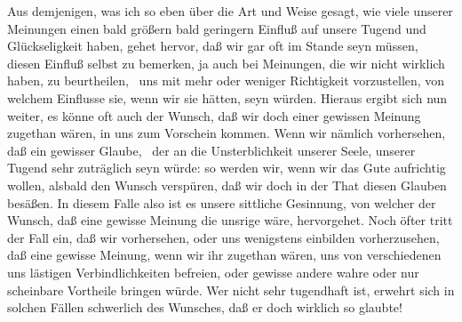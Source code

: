 Aus demjenigen, was ich so eben über die Art und Weise gesagt, wie viele unserer Meinungen einen bald größern bald geringern Einfluß auf unsere Tugend und Glückseligkeit haben, gehet hervor, daß wir gar oft im Stande seyn müssen, diesen Einfluß selbst zu bemerken, ja auch bei Meinungen, die wir nicht wirklich haben, zu beurtheilen, \dh\ uns mit mehr oder weniger Richtigkeit vorzustellen, von welchem Einflusse sie, wenn wir sie hätten, seyn würden. Hieraus ergibt sich nun weiter, es könne oft auch der Wunsch, daß wir doch einer gewissen Meinung zugethan wären, in uns zum Vorschein kommen. Wenn wir nämlich vorhersehen, daß ein gewisser Glaube, \zB\ der an die Unsterblichkeit unserer Seele, unserer Tugend sehr zuträglich seyn würde: so werden wir, wenn wir das Gute aufrichtig wollen, alsbald den Wunsch verspüren, daß wir doch in der That diesen Glauben besäßen. In diesem Falle also ist es unsere sittliche Gesinnung, von welcher der Wunsch, daß eine gewisse Meinung die unsrige wäre, hervorgehet. Noch öfter tritt der Fall ein, daß wir vorhersehen, oder uns wenigstens einbilden vorherzusehen, daß eine gewisse Meinung, wenn wir ihr zugethan wären, uns von verschiedenen uns lästigen Verbindlichkeiten befreien, oder gewisse andere wahre oder nur scheinbare Vortheile bringen würde. Wer nicht sehr tugendhaft ist, erwehrt sich in solchen Fällen schwerlich des Wunsches, daß er doch wirklich so glaubte!

